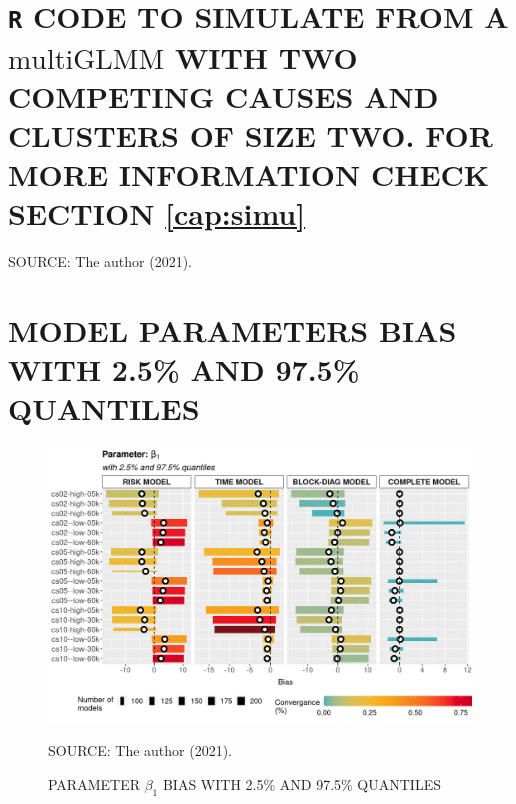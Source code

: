 \documentclass[12pt, %
               openright, %
               oneside, %
               a4paper, %
               chapter=TITLE, %
               section=TITLE, %
               brazil,
               english %
]{abntex2}
\begin{document}
\begin{apendicesenv}
\chapter{\texttt{R} CODE TO SIMULATE FROM A \(\text{multiGLMM}\) WITH
         TWO COMPETING CAUSES AND CLUSTERS OF SIZE TWO. FOR MORE
         INFORMATION CHECK SECTION \ref{cap:simu}}
\label{cap:appendixC}


\vspace{-0.5cm}
\begin{center}
 \begin{footnotesize}
  SOURCE: The author (2021).
 \end{footnotesize}
\end{center}

\chapter{MODEL PARAMETERS BIAS WITH 2.5\% AND 97.5\% QUANTILES}
\label{cap:appendixD}
\vspace{-0.65cm}
\begin{figure}[H]
 \setlength{\abovecaptionskip}{.0001pt}
 \caption{PARAMETER \(\beta_{1}\) BIAS WITH 2.5\% AND 97.5\% QUANTILES}
 \vspace{0.2cm}\centering
 \includegraphics[width=\textwidth]{bias2plot-1.png}\\
 \begin{footnotesize}
  SOURCE: The author (2021).
 \end{footnotesize}
 \label{fig:biasbeta1}
\end{figure}


\end{apendicesenv}
\end{document}
